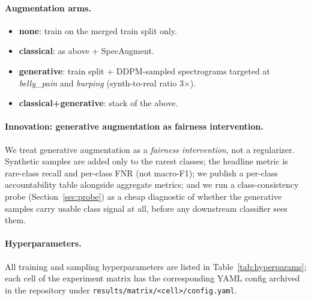 \documentclass[final]{article}
\begin{document}
\paragraph{Augmentation arms.}
\begin{itemize}
\item \textbf{none}: train on the merged train split only.
\item \textbf{classical}: as above + SpecAugment.
\item \textbf{generative}: train split + DDPM-sampled spectrograms targeted at \textit{belly\_pain} and \textit{burping} (synth-to-real ratio 3$\times$).
\item \textbf{classical+generative}: stack of the above.
\end{itemize}

\paragraph{Innovation: generative augmentation as fairness intervention.} We treat generative augmentation as a \emph{fairness intervention}, not a regularizer. Synthetic samples are added only to the rarest classes; the headline metric is rare-class recall and per-class FNR (not macro-F1); we publish a per-class accountability table alongside aggregate metrics; and we run a class-consistency probe (Section~\ref{sec:probe}) as a cheap diagnostic of whether the generative samples carry usable class signal at all, before any downstream classifier sees them.

\paragraph{Hyperparameters.} All training and sampling hyperparameters are listed in Table~\ref{tab:hyperparams}; each cell of the experiment matrix has the corresponding YAML config archived in the repository under \texttt{results/matrix/<cell>/config.yaml}.
\end{document}
